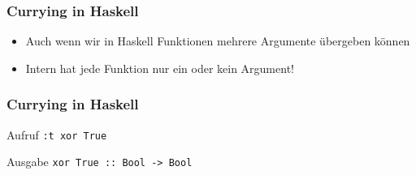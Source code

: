 \documentclass[fleqn,11pt,aspectratio=43]{beamer}
\begin{document}

\begin{frame}
\frametitle{Currying in Haskell}
\begin{block}{\vspace*{-3ex}}
\begin{itemize}
  \item Auch wenn wir in Haskell Funktionen mehrere Argumente übergeben können
  \item Intern hat jede Funktion nur ein oder kein Argument!
\end{itemize}
\end{block}
\end{frame}

\begin{frame}
\frametitle{Currying in Haskell}
\begin{block}{Aufruf}
\lstinline|:t xor True|
\end{block}
\begin{block}{Ausgabe}
\lstinline|xor True :: Bool -> Bool|
\end{block}
\end{frame}
\end{document}
